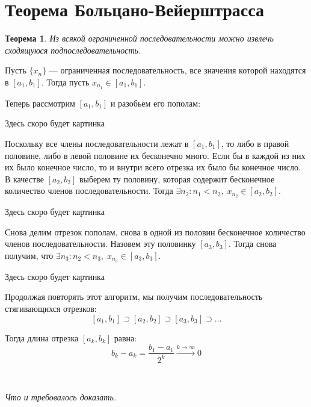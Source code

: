\documentclass[a4paper,12pt,oneside]{extbook}
\newcommand{\newpar}{$ $\par\nobreak\ignorespaces}
\theoremstyle{numbered}
\theoremstyle{unnumbered}
\newtheorem*{theorem*}{Теорема}
\theoremstyle{named}
\theoremstyle{unnumbered}
\theoremstyle{named}
\theoremstyle{named}
\theoremstyle{named}
\renewenvironment{proof}[1][]{\breakenv[Доказательство]{\if\relax\detokenize{#1}\relax\else\;\fi}{\textbf{#1}}}{\smallskip\newpar \hfill\textit{Что и требовалось доказать.}}
\begin{document}
\section{Теорема Больцано-Вейерштрасса}%
\label{sec:Теорема Больцано-Вейерштрасса}

\begin{theorem*}
    Из всякой ограниченной последовательности можно извлечь сходящуюся подпоследовательность.
\end{theorem*}

\begin{proof}
    Пусть \(\{x_n\}\) — ограниченная последовательность, все значения которой находятся в \([a_1, b_1]\). Тогда пусть \(x_{n_1} \in [a_1, b_1]\).

    Теперь рассмотрим \([a_1, b_1]\) и разобьем его пополам:
    \begin{center}
        Здесь скоро будет картинка
    \end{center}

    Поскольку все члены последовательности лежат в \([a_1, b_1]\), то либо в правой половине, либо в левой половине их бесконечно много. Если бы в каждой из них их было конечное число, то и внутри всего отрезка их было бы конечное число. В качестве \([a_2, b_2]\) выберем ту половину, которая содержит бесконечное количество членов последовательности. Тогда \(\exists n_2: n_1 < n_2, \; x_{n_2} \in [a_2, b_2]\).

    \begin{center}
        Здесь скоро будет картинка
    \end{center}

    Снова делим отрезок пополам, снова в одной из половин бесконечное количество членов последовательности. Назовем эту половинку \([a_3, b_3]\). Тогда снова получим, что \(\exists n_3: n_2 < n_3, \; x_{n_3} \in [a_3, b_3]\).

    \begin{center}
        Здесь скоро будет картинка
    \end{center}

    Продолжая повторять этот алгоритм, мы получим последовательность стягивающихся отрезков:
    \[
        [a_1, b_1] \supset [a_2, b_2] \supset [a_3, b_3] \supset \ldots
    \]

    Тогда длина отрезка \([a_k, b_k]\) равна:
    \[
        b_k - a_k = \frac{b_1 - a_1}{2^k} \overset{k \rightarrow \infty}{\longrightarrow} 0
    \]


\end{proof}
\end{document}

